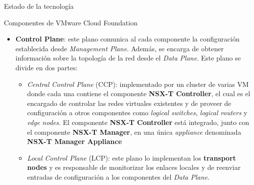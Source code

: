 \begin{section}{Estado de la tecnología}
\begin{subsection}{Componentes de VMware Cloud Foundation \cite{componentesCloudFound}}
\begin{itemize}
\begin{itemize}
        \item \textbf{Control Plane}: este plano comunica al cada componente la configuración establecida desde \textit{Management Plane}. Además, se encarga de obtener información sobre la topología de la red desde el \textit{Data Plane}. Este plano se divide en dos partes:
            \begin{itemize}
                \item \textit{Central Control Plane} (CCP): implementado por un cluster de varias VM donde cada una contiene el componente \textbf{NSX-T Controller}, el cual es el encargado de controlar las redes virtuales existentes y de proveer de configuración a otros componentes como \textit{logical switches}, \textit{logical routers} y \textit{edge nodes}. El componente \textbf{NSX-T Controller} está integrado, junto con el componente \textbf{NSX-T Manager}, en una única \textit{appliance} denominada \textbf{NSX-T Manager Appliance}
                \item \textit{Local Control Plane} (LCP): este plano lo implementan los \textbf{transport nodes} y es responsable de monitorizar los enlaces locales y de reenviar entradas de configuración a los componentes del \textit{Data Plane}.
            \end{itemize}

\end{itemize}
\end{itemize}
\end{subsection}
\end{section}
